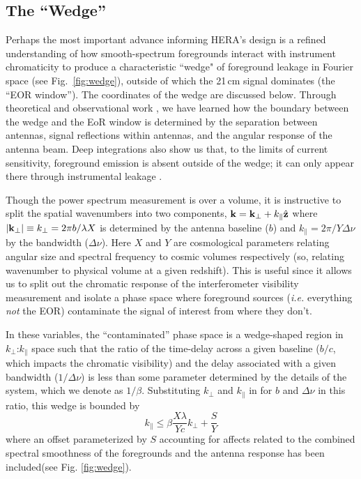 \documentclass[preprint,11pt]{aastex}
\newcommand{\kvec}{{\bf k}}
\newcommand{\kpr}{{k_\perp}}
\newcommand{\kvpr}{{\kvec_\perp}}
\def\kpar{k_{\|}}
\begin{document}
\subsection{The ``Wedge''}
\label{sec:wedge}
Perhaps the most important advance informing HERA's design is a
refined understanding of how smooth-spectrum foregrounds interact
with instrument chromaticity to produce a characteristic ``wedge" of
foreground leakage in Fourier space (see Fig.~\ref{fig:wedge}), 
outside of which the 21\,cm signal dominates (the ``EOR window'').  The coordinates of the wedge are discussed below.
Through theoretical and observational work
\citep{datta_etal2010,morales_et_al2012,parsons_et_al2012b,vedantham_2012,thyagarajan_et_al2013,hazelton_et_al2013,pober_etal2013b,liu_et_al2014a,liu_et_al2014b},
we have learned how the boundary between the wedge and  the EoR window is determined by the separation between antennas,
signal reflections within antennas, and the angular response of the antenna beam.  Deep integrations also show us
that, to the limits of current sensitivity, foreground emission is absent outside of the wedge; it can only 
appear there through instrumental leakage \citep{parsons_etal2014,ali_et_al2015,moore_et_al2016,kohn_et_al2016}.

Though the power spectrum measurement is over a volume, it is instructive to split the spatial wavenumbers into two components,  $\kvec =  \kvpr + \kpar{\hat {\bf z}}$ where $|\kvpr|\equiv \kpr = 2\pi b/\lambda X$ is determined by the antenna baseline ($b$) and $\kpar=2\pi/Y\Delta\nu$ by the bandwidth ($\Delta\nu$).  Here $X$ and $Y$ are cosmological parameters relating angular size and spectral frequency to cosmic volumes respectively (so, relating wavenumber to physical volume at a given redshift).  This is useful since it allows us to split out the chromatic response of the interferometer visibility measurement and isolate a phase space where foreground sources ({\em i.e.} everything {\em not} the EOR) contaminate the signal of interest from where they don't.  

In these variables, the ``contaminated'' phase space is a wedge-shaped region in $\kpr$:$\kpar$ space such that the ratio of the time-delay across a given baseline ($b/c$,  which impacts the chromatic visibility) and the delay associated with a given bandwidth ($1/\Delta\nu$) is less than some parameter determined by the details of the system, which we denote as $1/\beta$.  Substituting $\kpr$ and $\kpar$ in for $b$ and $\Delta\nu$ in this ratio, this wedge is bounded by
\begin{equation}
\kpar \le \beta\frac{X\lambda}{Yc}\kpr + \frac{S}{Y}
\end{equation}
where an offset parameterized by $S$ accounting for affects related to the combined spectral smoothness of the foregrounds and the antenna response has been included(see Fig. \ref{fig:wedge}). 
\end{document}

